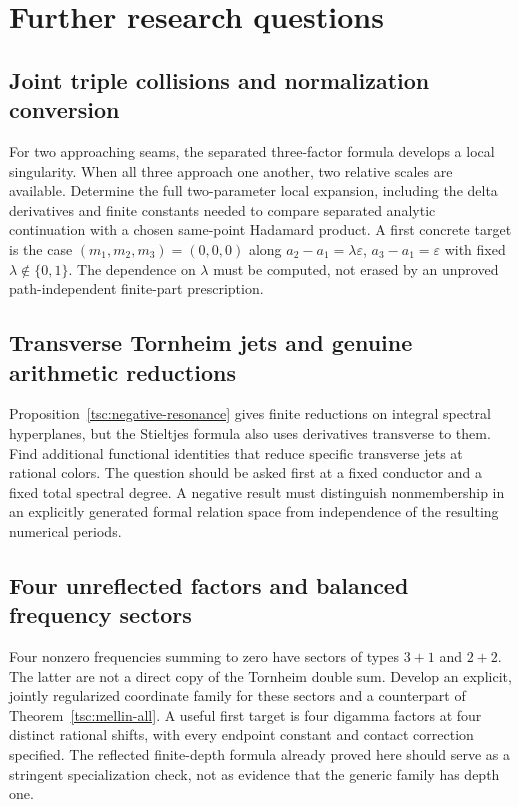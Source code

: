 \section{Further research questions}\label{tsc:further}
\subsection{Joint triple collisions and normalization conversion}
For two approaching seams, the separated three-factor formula develops a
local singularity. When all three approach one another, two relative
scales are available. Determine the full two-parameter local expansion,
including the delta derivatives and finite constants needed to compare
separated analytic continuation with a chosen same-point Hadamard product.
A first concrete target is the case $(m_1,m_2,m_3)=(0,0,0)$ along
$a_2-a_1=\lambda\varepsilon$, $a_3-a_1=\varepsilon$ with fixed
$\lambda\notin\{0,1\}$. The dependence on $\lambda$ must be computed,
not erased by an unproved path-independent finite-part prescription.

\subsection{Transverse Tornheim jets and genuine arithmetic reductions}
Proposition~\ref{tsc:negative-resonance} gives finite reductions on integral
spectral hyperplanes, but the Stieltjes formula also uses derivatives
transverse to them. Find additional functional identities that reduce
specific transverse jets at rational colors. The question should be asked
first at a fixed conductor and a fixed total spectral degree. A negative
result must distinguish nonmembership in an explicitly generated formal
relation space from independence of the resulting numerical periods.

\subsection{Four unreflected factors and balanced frequency sectors}
Four nonzero frequencies summing to zero have sectors of types $3+1$ and
$2+2$. The latter are not a direct copy of the Tornheim double sum. Develop
an explicit, jointly regularized coordinate family for these sectors and
a counterpart of Theorem~\ref{tsc:mellin-all}. A useful first target is
four digamma factors at four distinct rational shifts, with every endpoint
constant and contact correction specified. The reflected finite-depth
formula already proved here should serve as a stringent specialization
check, not as evidence that the generic family has depth one.

